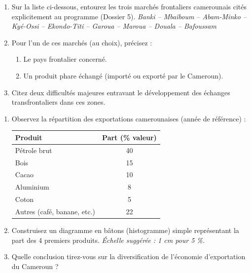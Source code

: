 \documentclass[11pt]{article}
\begin{document}
\begin{exercice}
\begin{enumerate}
    \item Sur la liste ci-dessous, entourez les trois marchés frontaliers camerounais cités explicitement au programme (Dossier 5).
    \textit{Banki -- Mbaïboum -- Abam-Minko -- Kyé-Ossi -- Ekondo-Titi -- Garoua -- Maroua -- Douala -- Bafoussam}
    \item Pour l'un de ces marchés (au choix), précisez :
    \begin{enumerate}
        \item Le pays frontalier concerné.
        \item Un produit phare échangé (importé ou exporté par le Cameroun).
    \end{enumerate}
    \item Citez deux difficultés majeures entravant le développement des échanges transfrontaliers dans ces zones.
\end{enumerate}
\end{exercice}

\begin{exercice}
\begin{enumerate}
    \item Observez la répartition des exportations camerounaises (année de référence) :
    \begin{tabular}{|l|c|}
    \hline
    \textbf{Produit} & \textbf{Part (\% valeur)} \\
    \hline
    Pétrole brut & 40 \\
    \hline
    Bois & 15 \\
    \hline
    Cacao & 10 \\
    \hline
    Aluminium & 8 \\
    \hline
    Coton & 5 \\
    \hline
    Autres (café, banane, etc.) & 22 \\
    \hline
    \end{tabular}
    \item Construisez un diagramme en bâtons (histogramme) simple représentant la part des 4 premiers produits. \textit{Échelle suggérée : 1 cm pour 5 \%.}
    \item Quelle conclusion tirez-vous sur la diversification de l'économie d'exportation du Cameroun ?
\end{enumerate}
\end{exercice}
\end{document}
